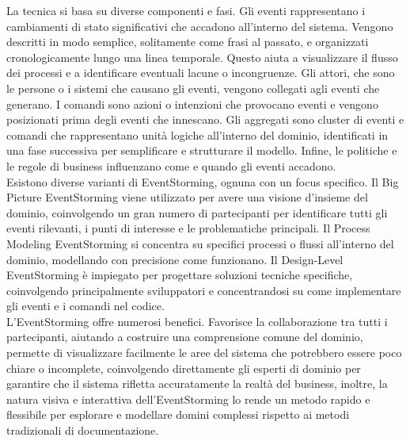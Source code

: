 La tecnica si basa su diverse componenti e fasi. Gli eventi rappresentano i cambiamenti di stato significativi che accadono all'interno del sistema. Vengono descritti in modo semplice, solitamente come frasi al passato, e organizzati cronologicamente lungo una linea temporale. Questo aiuta a visualizzare il flusso dei processi e a identificare eventuali lacune o incongruenze. Gli attori, che sono le persone o i sistemi che causano gli eventi, vengono collegati agli eventi che generano. I comandi sono azioni o intenzioni che provocano eventi e vengono posizionati prima degli eventi che innescano. Gli aggregati sono cluster di eventi e comandi che rappresentano unità logiche all'interno del dominio, identificati in una fase successiva per semplificare e strutturare il modello. Infine, le politiche e le regole di business influenzano come e quando gli eventi accadono.\\

Esistono diverse varianti di EventStorming, ognuna con un focus specifico. Il Big Picture EventStorming viene utilizzato per avere una visione d'insieme del dominio, coinvolgendo un gran numero di partecipanti per identificare tutti gli eventi rilevanti, i punti di interesse e le problematiche principali. Il Process Modeling EventStorming si concentra su specifici processi o flussi all'interno del dominio, modellando con precisione come funzionano. Il Design-Level EventStorming è impiegato per progettare soluzioni tecniche specifiche, coinvolgendo principalmente sviluppatori e concentrandosi su come implementare gli eventi e i comandi nel codice.\\

L'EventStorming offre numerosi benefici. Favorisce la collaborazione tra tutti i partecipanti, aiutando a costruire una comprensione comune del dominio, permette di visualizzare facilmente le aree del sistema che potrebbero essere poco chiare o incomplete, coinvolgendo direttamente gli esperti di dominio per garantire che il sistema rifletta accuratamente la realtà del business, inoltre, la natura visiva e interattiva dell'EventStorming lo rende un metodo rapido e flessibile per esplorare e modellare domini complessi rispetto ai metodi tradizionali di documentazione.\\

